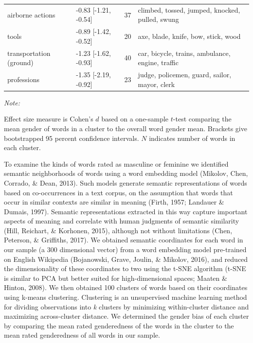 \documentclass[
  english,
  ,man,floatsintext]{apa6}
\begin{document}
\begin{table}
{\begin{threeparttable}
\begin{tabular}[t]{llrl}
\hspace{1em}airborne actions & -0.83 [-1.21, -0.54] & 37 & climbed, tossed, jumped, knocked, pulled, swung\\
\hspace{1em}tools & -0.89 [-1.42, -0.52] & 20 & axe, blade, knife, bow, stick, wood\\
\hspace{1em}transportation (ground) & -1.23 [-1.62, -0.93] & 40 & car, bicycle, trains, ambulance, engine, traffic\\
\hspace{1em}professions & -1.35 [-2.19, -0.92] & 23 & judge, policemen, guard, sailor, mayor, clerk\\
\bottomrule
\end{tabular}
\begin{tablenotes}[para]
\item \textit{Note:} 
\item Effect size measure is Cohen's $d$ based on a one-sample $t$-test comparing the mean gender of words in a cluster to the overall word gender mean. Brackets give bootstrapped 95 percent confidence intervals. $N$ indicates number of words in each cluster.
\end{tablenotes}
\end{threeparttable}}
\end{table}

To examine the kinds of words rated as masculine or feminine we identified semantic neighborhoods of words using a word embedding model (Mikolov, Chen, Corrado, \& Dean, 2013). Such models generate semantic representations of words based on co-occurrences in a text corpus, on the assumption that words that occur in similar contexts are similar in meaning (Firth, 1957; Landauer \& Dumais, 1997). Semantic representations extracted in this way capture important aspects of meaning and correlate with human judgments of semantic similarity (Hill, Reichart, \& Korhonen, 2015), although not without limitations (Chen, Peterson, \& Griffiths, 2017). We obtained semantic coordinates for each word in our sample (a 300 dimensional vector) from a word embedding model pre-trained on English Wikipedia (Bojanowski, Grave, Joulin, \& Mikolov, 2016), and reduced the dimensionality of these coordinates to two using the t-SNE algorithm (t-SNE is similar to PCA but better suited for high-dimensional spaces; Maaten \& Hinton, 2008). We then obtained 100 clusters of words based on their coordinates using k-means clustering. Clustering is an unsupervised machine learning method for dividing observations into \emph{k} clusters by minimizing within-cluster distance and maximizing across-cluster distance. We determined the gender bias of each cluster by comparing the mean rated genderedness of the words in the cluster to the mean rated genderedness of all words in our sample.
\end{document}
